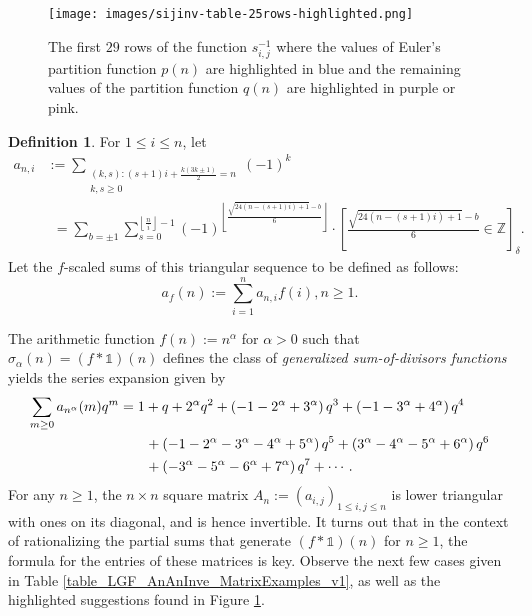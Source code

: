 \documentclass[12pt,reqno,a4letter]{article}
\numberwithin{figure}{section}
\numberwithin{table}{section}
\numberwithin{equation}{section}
\newcommand{\Iverson}[1]{\ensuremath{\left[#1\right]_{\delta}}}
\theoremstyle{plain}
\numberwithin{theorem}{section}
\theoremstyle{definition}
\newtheorem{definition}[theorem]{Definition}
\begin{document}
\begin{figure}[ht!]
\centering
\texttt{[image: images/sijinv-table-25rows-highlighted.png]}

\caption[Inverse matrices in the first forms of the LGF factorization theorems]{
         The first $29$ rows of the function $s_{i,j}^{-1}$ where the values of 
         Euler's partition function $p(n)$ are highlighted in blue and the remaining 
         values of the partition function $q(n)$ are highlighted in 
         purple or pink. } 
\label{figure_sijinv_first25_rows_highlighted} 

\end{figure} 

\begin{definition}
\label{def_LGF_ani_afn_funcs_v1} 
For $1 \leq i \leq n$, let 
\begin{align*}
a_{n,i} & := \sum_{\substack{(k, s) : (s+1)i+\frac{k(3k\pm 1)}{2} = n \\ k, s \geq 0}} (-1)^k \\ 
     & \phantom{:} = 
     \sum_{b = \pm 1} \sum_{s=0}^{\left\lfloor \frac{n}{i} \right\rfloor - 1} 
     (-1)^{\left\lfloor \frac{\sqrt{24(n-(s+1)i)+1}-b}{6} \right\rfloor} \cdot 
     \Iverson{\frac{\sqrt{24(n-(s+1)i)+1}-b}{6} \in \mathbb{Z}}. 
\end{align*}
Let the $f$-scaled sums of this triangular sequence to be defined as follows: 
\[
a_f(n) := \sum_{i=1}^{n} a_{n,i} f(i), n \geq 1.
\]
\end{definition}

The arithmetic function $f(n) := n^{\alpha}$ for $\alpha > 0$ such that 
$\sigma_{\alpha}(n) = (f \ast \mathds{1})(n)$ defines the class of 
\emph{generalized sum-of-divisors functions} yields the series expansion given by 
\begin{align} 
\label{eqn_afn_special_cases} 
\sum_{m \geq 0} a_{n^\alpha}(m) q^m & = 1 + q + 2^{\alpha} q^2 + 
     \left(-1-2^{\alpha}+3^{\alpha}\right)q^3 + 
     \left(-1-3^{\alpha}+4^{\alpha}\right)q^4 \\ 
\notag 
     & \phantom{=q\ } + 
     \left(-1-2^{\alpha}-3^{\alpha}-4^{\alpha}+5^{\alpha}\right)q^5 + 
     \left(3^{\alpha}-4^{\alpha}-5^{\alpha}+6^{\alpha}\right) q^6 \\ 
\notag 
     & \phantom{=q\ } + 
     \left(-3^{\alpha}-5^{\alpha}-6^{\alpha}+7^{\alpha}\right) q^7 + \cdots. 
\end{align}
For any $n \geq 1$, the $n \times n$ square matrix $A_n := (a_{i,j})_{1 \leq i,j \leq n}$ is 
lower triangular with ones on its diagonal, and is hence invertible. 
It turns out that in the context of rationalizing the partial sums that generate 
$(f \ast \mathds{1})(n)$ for $n \geq 1$, 
the formula for the entries of these matrices is key. 
Observe the next few cases given in 
Table \ref{table_LGF_AnAnInve_MatrixExamples_v1}, 
as well as the highlighted suggestions found in 
Figure \ref{figure_sijinv_first25_rows_highlighted}. 
\end{document}

